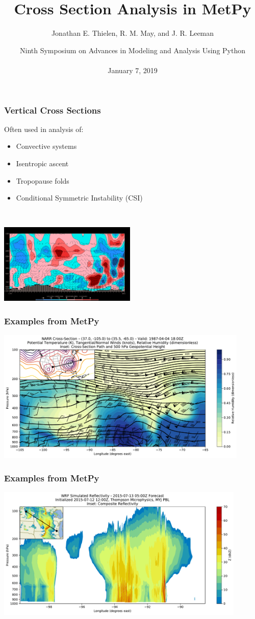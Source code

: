 \documentclass{beamer}
\title[MetPy Cross Sections (288)]{Cross Section Analysis in MetPy}
\author[Thielen et al.]{Jonathan E. Thielen, R. M. May, and J. R. Leeman}
\date[January 7, 2019]{Ninth Symposium on Advances in Modeling and Analysis Using Python\\ \ \\January 7, 2019}
\begin{document}
\frame{\titlepage}

\begin{frame}
	\frametitle{Vertical Cross Sections}
    Often used in analysis of:
    \begin{itemize}
      \item Convective systems
      \item Isentropic ascent
      \item Tropopause folds
      \item Conditional Symmetric Instability (CSI)
    \end{itemize}
    
    \ 
    
    \begin{center}
        \includegraphics[height=1.5in]{figures/gempak_cross.png}
    \end{center}
\end{frame}

\begin{frame}
    \frametitle{Examples from MetPy}
    \begin{center}
        \includegraphics[height=2.5in]{figures/basic_example_narr.pdf}
    \end{center}
\end{frame}

\begin{frame}
    \frametitle{Examples from MetPy}
    \begin{center}
        \includegraphics[height=2.5in]{figures/wrf_refl.pdf}
    \end{center}
\end{frame}
\end{document}
